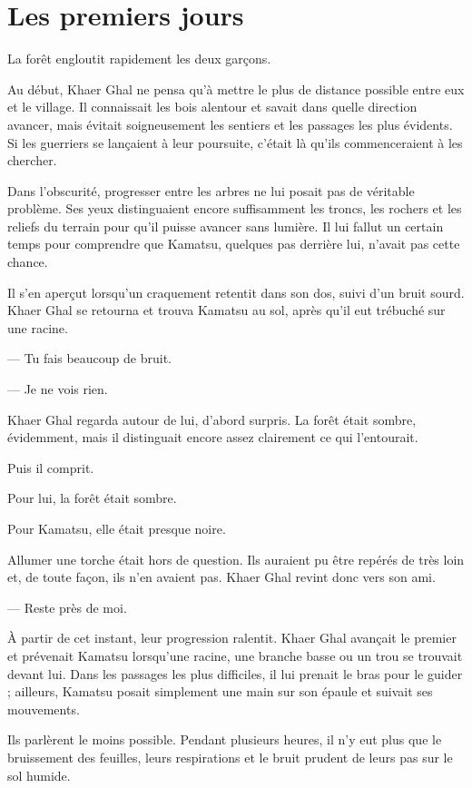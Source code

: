 \chapter{Les premiers jours}

La forêt engloutit rapidement les deux garçons.

Au début, Khaer Ghal ne pensa qu'à mettre le plus de distance possible entre
eux et le village. Il connaissait les bois alentour et savait dans quelle
direction avancer, mais évitait soigneusement les sentiers et les passages les
plus évidents. Si les guerriers se lançaient à leur poursuite, c'était là
qu'ils commenceraient à les chercher.

Dans l'obscurité, progresser entre les arbres ne lui posait pas de véritable
problème. Ses yeux distinguaient encore suffisamment les troncs, les rochers et
les reliefs du terrain pour qu'il puisse avancer sans lumière. Il lui fallut
un certain temps pour comprendre que Kamatsu, quelques pas derrière lui, n'avait
pas cette chance.

Il s'en aperçut lorsqu'un craquement retentit dans son dos, suivi d'un bruit
sourd. Khaer Ghal se retourna et trouva Kamatsu au sol, après qu'il eut trébuché
sur une racine.

— Tu fais beaucoup de bruit.

— Je ne vois rien.

Khaer Ghal regarda autour de lui, d'abord surpris. La forêt était sombre,
évidemment, mais il distinguait encore assez clairement ce qui l'entourait.

Puis il comprit.

Pour lui, la forêt était sombre.

Pour Kamatsu, elle était presque noire.

Allumer une torche était hors de question. Ils auraient pu être repérés de très
loin et, de toute façon, ils n'en avaient pas. Khaer Ghal revint donc vers son
ami.

— Reste près de moi.

À partir de cet instant, leur progression ralentit. Khaer Ghal avançait le
premier et prévenait Kamatsu lorsqu'une racine, une branche basse ou un trou se
trouvait devant lui. Dans les passages les plus difficiles, il lui prenait le
bras pour le guider ; ailleurs, Kamatsu posait simplement une main sur son
épaule et suivait ses mouvements.

Ils parlèrent le moins possible. Pendant plusieurs heures, il n'y eut plus que
le bruissement des feuilles, leurs respirations et le bruit prudent de leurs
pas sur le sol humide.

